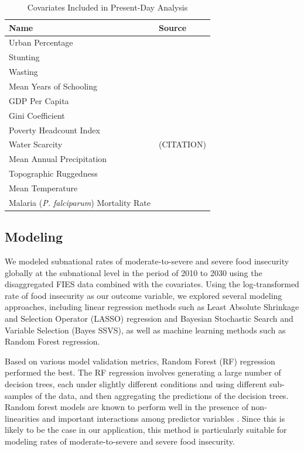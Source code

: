 \documentclass{article}
\begin{document}
\begin{table}[H]
  \centering
	\begin{tabular}{ll}
		\toprule
		Name & Source \\
		\midrule
		Urban Percentage & \citep{Jones2016} \\
		Stunting & \citep{Local2020} \\
		Wasting & \citep{Local2020} \\
		Mean Years of Schooling & \citep{Smits2019, KC2017} \\
		GDP Per Capita & \citep{Smits2019, Dellink2017} \\
		Gini Coefficient & \citep{Rao2019a} \\
    Poverty Headcount Index & \citep{Cuaresma2018} \\
		Water Scarcity & (CITATION) \\
		Mean Annual Precipitation &  \cite{abatzoglou2018terraclimate, warszawski2014inter} \\
		Topographic Ruggedness &  \cite{USGS1996, Riley1999} \\
		Mean Temperature &  \cite{abatzoglou2018terraclimate, warszawski2014inter} \\
		Malaria (\textit{P. falciparum}) Mortality Rate &  \cite{Weiss2019} \\
		\bottomrule
	\end{tabular}
	\caption{Covariates Included in Present-Day Analysis}
	\label{tab:covars}
\end{table}


\subsection{Modeling}

We modeled subnational rates of moderate-to-severe and severe food insecurity globally at the subnational level in the period of 2010 to 2030 using the disaggregated FIES data combined with the covariates. Using the log-transformed rate of food insecurity as our outcome variable, we explored several modeling approaches, including linear regression methods such as Least Absolute Shrinkage and Selection Operator (LASSO) regression and Bayesian Stochastic Search and Variable Selection (Bayes SSVS), as well as machine learning methods such as Random Forest regression. 

Based on various model validation metrics, Random Forest (RF) regression performed the best. The RF regression involves generating a large number of decision trees, each under slightly different conditions and using different sub-samples of the data, and then aggregating the predictions of the decision trees.  Random forest models are known to perform well in the presence of non-linearities and important interactions among predictor variables \citep{breiman2001random}. Since this is likely to be the case in our application, this method is particularly suitable for modeling rates of moderate-to-severe and severe food insecurity. 
\end{document}
